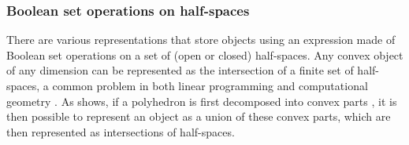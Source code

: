 \subsubsection{Boolean set operations on half-spaces}

There are various representations that store objects using an expression made of Boolean set operations on a set of (open or closed) half-spaces.
Any convex object of any dimension can be represented as the intersection of a finite set of half-spaces, a common problem in both linear programming and computational geometry \citep{Shamos76,Preparata79}.
As  shows, if a polyhedron is first decomposed into convex parts \citep{Chazelle79,Bajaj90}, it is then possible to represent an object as a union of these convex parts, which are then represented as intersections of half-spaces.
\begin{figure}[b]
\centering
{}
\end{figure}
